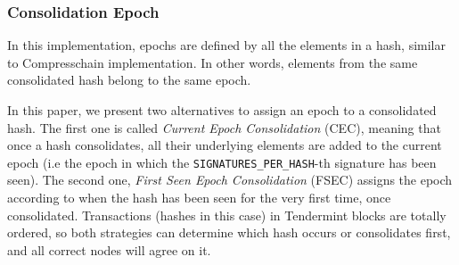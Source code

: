 %


%




\subsubsection{Consolidation Epoch}\label{subsubsec:consolidation}

In this implementation, epochs are defined by all the elements in a hash, similar to
Compresschain implementation.
%
In other words, elements from the same consolidated hash belong to the same
epoch.
%
%

%

In this paper, we present two alternatives to assign an epoch to a consolidated
hash.
%
The first one is called \textit{Current Epoch Consolidation} (CEC), meaning that
once a hash consolidates, all their underlying elements are added to the current
epoch (i.e the epoch in which the \texttt{SIGNATURES\_PER\_HASH}-th signature
has been seen).
%
The second one, \textit{First Seen Epoch Consolidation} (FSEC) assigns the epoch
according to when the hash has been seen for the very first time, once
consolidated.
%
Transactions (hashes in this case) in Tendermint blocks are totally
ordered, so both strategies can determine which hash occurs or
consolidates first, and all correct nodes will agree on it.


